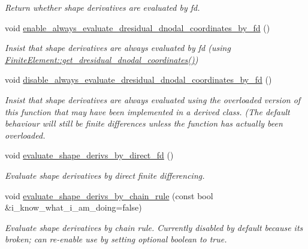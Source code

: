\begin{DoxyCompactItemize}
\begin{DoxyCompactList}\small\item\em Return whether shape derivatives are evaluated by fd. \end{DoxyCompactList}\item 
void \hyperlink{classoomph_1_1ElementWithMovingNodes_af3b9389f9b34d941ca1b9a058ce4cc2c}{enable\+\_\+always\+\_\+evaluate\+\_\+dresidual\+\_\+dnodal\+\_\+coordinates\+\_\+by\+\_\+fd} ()
\begin{DoxyCompactList}\small\item\em Insist that shape derivatives are always evaluated by fd (using \hyperlink{classoomph_1_1FiniteElement_ae4b85a31a983a52d3010930f9e0851b8}{Finite\+Element\+::get\+\_\+dresidual\+\_\+dnodal\+\_\+coordinates()}) \end{DoxyCompactList}\item 
void \hyperlink{classoomph_1_1ElementWithMovingNodes_ad8493e8dbf92f44106c10f8f58bfffa3}{disable\+\_\+always\+\_\+evaluate\+\_\+dresidual\+\_\+dnodal\+\_\+coordinates\+\_\+by\+\_\+fd} ()
\begin{DoxyCompactList}\small\item\em Insist that shape derivatives are always evaluated using the overloaded version of this function that may have been implemented in a derived class. (The default behaviour will still be finite differences unless the function has actually been overloaded. \end{DoxyCompactList}\item 
void \hyperlink{classoomph_1_1ElementWithMovingNodes_aad094d008fb6aa1531f730c012c46494}{evaluate\+\_\+shape\+\_\+derivs\+\_\+by\+\_\+direct\+\_\+fd} ()
\begin{DoxyCompactList}\small\item\em Evaluate shape derivatives by direct finite differencing. \end{DoxyCompactList}\item 
void \hyperlink{classoomph_1_1ElementWithMovingNodes_aba14c845323dc4ef435afd18314ede70}{evaluate\+\_\+shape\+\_\+derivs\+\_\+by\+\_\+chain\+\_\+rule} (const bool \&i\+\_\+know\+\_\+what\+\_\+i\+\_\+am\+\_\+doing=false)
\begin{DoxyCompactList}\small\item\em Evaluate shape derivatives by chain rule. Currently disabled by default because it\textquotesingle{}s broken; can re-\/enable use by setting optional boolean to true. \end{DoxyCompactList}\item 

\end{DoxyCompactItemize}
